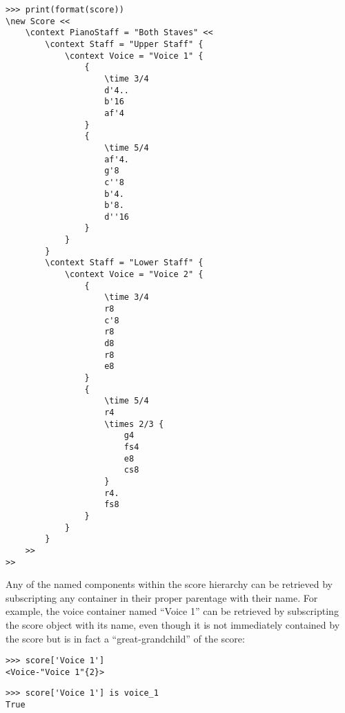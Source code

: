 \begin{abjadbookoutput}
\begin{singlespacing}
\vspace{-0.5\baselineskip}
\begin{lstlisting}
>>> print(format(score))
\new Score <<
    \context PianoStaff = "Both Staves" <<
        \context Staff = "Upper Staff" {
            \context Voice = "Voice 1" {
                {
                    \time 3/4
                    d'4..
                    b'16
                    af'4
                }
                {
                    \time 5/4
                    af'4.
                    g'8
                    c''8
                    b'4.
                    b'8.
                    d''16
                }
            }
        }
        \context Staff = "Lower Staff" {
            \context Voice = "Voice 2" {
                {
                    \time 3/4
                    r8
                    c'8
                    r8
                    d8
                    r8
                    e8
                }
                {
                    \time 5/4
                    r4
                    \times 2/3 {
                        g4
                        fs4
                        e8
                        cs8
                    }
                    r4.
                    fs8
                }
            }
        }
    >>
>>
\end{lstlisting}
\end{singlespacing}
\end{abjadbookoutput}

\noindent Any of the named components within the score hierarchy can be
retrieved by subscripting any container in their proper parentage with their
name. For example, the voice container named \enquote{Voice 1} can be retrieved
by subscripting the score object with its name, even though it is not
immediately contained by the score but is in fact a \enquote{great-grandchild}
of the score:

\begin{comment}
<abjad>
score['Voice 1']
score['Voice 1'] is voice_1
</abjad>
\end{comment}

\begin{abjadbookoutput}
\begin{singlespacing}
\vspace{-0.5\baselineskip}
\begin{lstlisting}
>>> score['Voice 1']
<Voice-"Voice 1"{2}>
\end{lstlisting}
\begin{lstlisting}
>>> score['Voice 1'] is voice_1
True
\end{lstlisting}
\end{singlespacing}
\end{abjadbookoutput}

